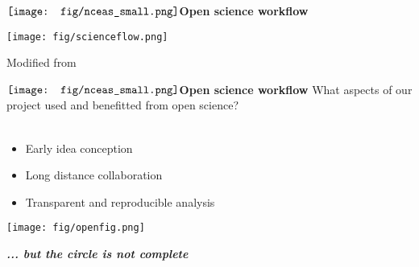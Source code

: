 \documentclass[serif]{beamer}\usepackage[]{graphicx}\usepackage[]{color}
\newcommand{\emtxt}[1]{\textbf{\textit{{\color{mypal4} #1}}}}
\begin{document}
\begin{frame}{{$\vcenter{\hbox{\texttt{[image: fig/nceas\_small.png]}}}$\hspace{0.07in}\textbf{Open science workflow}}}
\centerline{\texttt{[image: fig/scienceflow.png]}}
\vfill
\tiny
Modified from \cite{Hampton15}
\end{frame}

\begin{frame}{{$\vcenter{\hbox{\texttt{[image: fig/nceas\_small.png]}}}$\hspace{0.07in}\textbf{Open science workflow}}}
What aspects of our project used and benefitted from open science? \\~\\
\begin{itemize}
\item Early idea conception
\item Long distance collaboration
\item Transparent and reproducible analysis
\end{itemize}
\vspace{0.1in}
\begin{center}
\texttt{[image: fig/openfig.png]}
\end{center}
\vspace{0.1in}
\centerline{\emtxt{... but the circle is not complete}}
\end{frame}
\end{document}
